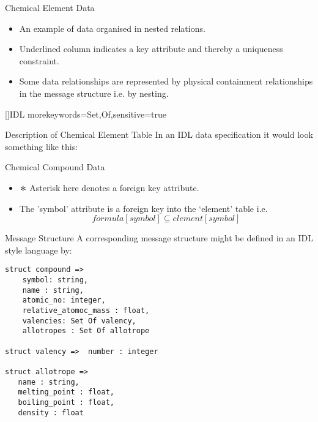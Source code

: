 

\begin{frame}{Chemical Element Data}
\scalebox{0.75}{

}

\begin{itemize}
	\item An example of data organised in nested relations.
	\item Underlined column indicates a key attribute and thereby a uniqueness constraint.
	\item Some data relationships are represented by physical containment relationships in the message structure i.e. by nesting.
\end{itemize}
\end{frame}

[]{IDL}
{morekeywords={Set,Of},sensitive=true}



\begin{frame}[fragile]{Description of Chemical Element Table}
In an IDL data specification it would look something like this:

\end{frame}

\begin{frame}{Chemical Compound Data}
\scalebox{0.75}{

}
\begin{itemize}
\item $\largeAsterisk$ Asterisk here denotes a foreign key attribute. 
\item The 'symbol' attribute is a foreign key into the `element' table i.e.
	\begin{equation}
	              formula[symbol] \subseteq element[symbol]
	\end{equation}
\end{itemize}	
\end{frame}

\begin{frame}[fragile]{Message Structure}
A corresponding message structure might be defined 
in an IDL style language by:

\begin{lstlisting}[basicstyle=\footnotesize,keywordstyle={\ttfamily\color{green}\bfseries},language=myIDL]
struct compound => 
    symbol: string,
    name : string,
    atomic_no: integer,
    relative_atomoc_mass : float,
    valencies: Set Of valency,
    allotropes : Set Of allotrope

struct valency =>  number : integer 

struct allotrope =>
   name : string,
   melting_point : float,
   boiling_point : float,
   density : float
\end{lstlisting}
\end{frame}





